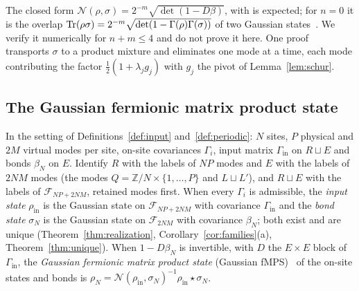 \begin{remark}\label{rem:overlap}
The closed form $\mathcal N(\rho,\sigma)=2^{-m}\sqrt{\det(1-D\beta)}$, with  is expected; for $n=0$ it is the
overlap $\operatorname{Tr}(\rho\sigma)=2^{-m}\sqrt{\det(1-\Gamma(\rho)\Gamma(\sigma))}$ of two Gaussian
states~\cite{bravyi}. We verify it numerically for $n+m\leq4$  and do not prove it here. One proof
transports $\sigma$ to a product mixture and eliminates one mode at a time, each mode
contributing the factor $\tfrac12(1+\lambda_jg_j)$ with $g_j$ the pivot of
Lemma~\ref{lem:schur}.
\end{remark}

\subsection{The Gaussian fermionic matrix product state}
\label{sec:chain-state}

\begin{definition}\label{def:chain-state}
In the setting of Definitions~\ref{def:input} and~\ref{def:periodic}: $N$ sites, $P$ physical and
$2M$ virtual modes per site, on-site covariances $\Gamma_i$, input matrix $\Gamma_{\mathrm{in}}$ on
$R\sqcup E$ and bonds $\beta_N$ on $E$. Identify $R$ with the labels of $NP$ modes and $E$ with
the labels of $2NM$ modes (the modes $Q=\mathbb Z/N\times\{1,\ldots,P\}$ and $L\sqcup L'$), and
$R\sqcup E$ with the labels of $\mathcal F_{NP+2NM}$, retained modes first. When every $\Gamma_i$ is
admissible, the \emph{input state} $\rho_{\mathrm{in}}$ is the Gaussian state on
$\mathcal F_{NP+2NM}$ with covariance $\Gamma_{\mathrm{in}}$ and the \emph{bond state} $\sigma_N$ is
the Gaussian state on $\mathcal F_{2NM}$ with covariance $\beta_N$; both exist and are unique
(Theorem~\ref{thm:realization}, Corollary~\ref{cor:families}(a), Theorem~\ref{thm:unique}). When
$1-D\beta_N$ is invertible, with $D$ the $E\times E$ block of $\Gamma_{\mathrm{in}}$, the
\emph{Gaussian fermionic matrix product state} (Gaussian fMPS)~\cite{ksvc} of the on-site
states and bonds is $\rho_N=\mathcal N(\rho_{\mathrm{in}},\sigma_N)^{-1}\rho_{\mathrm{in}}\star\sigma_N$.
\end{definition}

